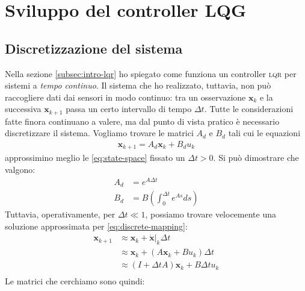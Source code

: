 \section{Sviluppo del controller \textsc{LQG}}\label{sec:lqg}
\subsection{Discretizzazione del sistema}\label{subsec:discretizzazione}
Nella sezione \ref{subsec:intro-lqr} ho spiegato come funziona un controller \textsc{lqr} per sistemi a \emph{tempo continuo}.
Il sistema che ho realizzato, tuttavia, non può raccogliere dati dai sensori in modo continuo: tra un osservazione
$\mathbf x_k$ e la successiva $\mathbf x_{k+1}$ passa un certo intervallo di tempo $\Delta t$.
Tutte le considerazioni fatte finora continuano a valere, ma dal punto di vista pratico è necessario discretizzare il sistema.
Vogliamo trovare le matrici $A_d$ e $B_d$ tali cui le equazioni
\begin{equation}
  \begin{aligned}
    \mathbf{x}_{k+1} = A_d \mathbf{x}_k + B_d u_k
  \end{aligned}
  \label{eq:moto-discreto}
\end{equation}
approssimino meglio le \eqref{eq:state-space} fissato un $\Delta t > 0$.
Si può dimostrare\cite{brunton2019data}
che valgono:
\begin{equation}
  \begin{aligned}
    A_d &= e^{A\Delta t} \\
    B_d &= B\left( \int_0^{\Delta t} e^{A s} ds \right)
  \end{aligned}
  \label{eq:discrete-mapping}
\end{equation}
Tuttavia, operativamente, per $\Delta t \ll 1$, possiamo trovare velocemente una soluzione approssimata per \eqref{eq:discrete-mapping}:
\begin{equation}
  \begin{aligned}
    \mathbf x_{k+1} &\approx \mathbf x_k + \dot {\mathbf x}|_k \Delta t\\
      &\approx \mathbf x_k + (A \mathbf x_k + B u_k) \Delta t\\
      &\approx (I + \Delta t A) \mathbf x_k + B \Delta t u_k\\
  \end{aligned}
  \label{eq:discrete-mapping-approx}
\end{equation}
Le matrici che cerchiamo sono quindi:
